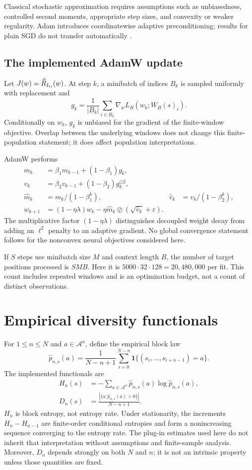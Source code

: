 \documentclass[11pt]{article}
\newcommand{\A}{\mathcal A}
\newcommand{\1}{\mathbf 1}
\begin{document}
Classical stochastic approximation requires assumptions such as unbiasedness,
controlled second moments, appropriate step sizes, and convexity or weaker
regularity. Adam introduces coordinatewise adaptive preconditioning; results
for plain SGD do not transfer automatically \cite{kingma-2015-adam}.

\subsection{The implemented AdamW update}

Let $J(w)=\widehat R_{I_{\rm tr}}(w)$. At step $k$, a minibatch of indices
$B_k$ is sampled uniformly with replacement and
\[
 g_k=\frac1{|B_k|}\sum_{i\in B_k}\nabla_w L_B(w_k;W_B(s)_i).
\]
Conditionally on $w_k$, $g_k$ is unbiased for the gradient of the finite-window
objective. Overlap between the underlying windows does not change this
finite-population statement; it does affect population interpretations.

AdamW performs \cite{kingma-2015-adam,loshchilov-2019-adamw}
\begin{align*}
 m_k&=\beta_1m_{k-1}+(1-\beta_1)g_k,\\
 v_k&=\beta_2v_{k-1}+(1-\beta_2)g_k^{\odot2},\\
 \widehat m_k&=m_k/(1-\beta_1^k),
 &\widehat v_k&=v_k/(1-\beta_2^k),\\
 w_{k+1}&=(1-\eta\lambda)w_k-
 \eta\widehat m_k\oslash(\sqrt{\widehat v_k}+\varepsilon).
\end{align*}
The multiplicative factor $(1-\eta\lambda)$ distinguishes decoupled weight
decay from adding an $\ell^2$ penalty to an adaptive gradient. No global
convergence statement follows for the nonconvex neural objectives considered
here.

If $S$ steps use minibatch size $M$ and context length $B$, the number of target
positions processed is $SMB$. Here it is
$5000\cdot32\cdot128=20{,}480{,}000$ per fit. This count includes repeated
windows and is an optimization budget, not a count of distinct observations.

\section{Empirical diversity functionals}

For $1\le n\le N$ and $a\in\A^n$, define the empirical block law
\[
 \widehat p_{n,s}(a)=\frac1{N-n+1}
 \sum_{i=0}^{N-n}\1\{(s_i,\ldots,s_{i+n-1})=a\}.
\]
The implemented functionals are
\begin{align}
 H_n(s)&=-\sum_{a\in\A^n}\widehat p_{n,s}(a)
             \log\widehat p_{n,s}(a),\label{eq:block-entropy}\\
 D_n(s)&=\frac{|\{a:\widehat p_{n,s}(a)>0\}|}{N-n+1}.
 \label{eq:distinct}
\end{align}
$H_n$ is block entropy, not entropy rate. Under stationarity, the increments
$H_n-H_{n-1}$ are finite-order conditional entropies and form a nonincreasing
sequence converging to the entropy rate. The plug-in estimates used here do not
inherit that interpretation without assumptions and finite-sample analysis.
Moreover, $D_n$ depends strongly on both $N$ and $n$; it is not an intrinsic
property unless those quantities are fixed.
\end{document}
